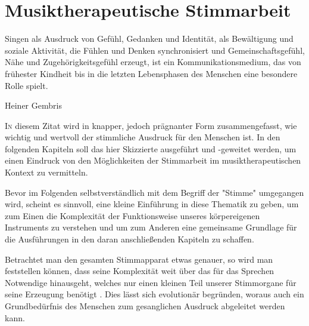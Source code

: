 
\chapter{Musiktherapeutische Stimmarbeit}
\label{chapter:musiktherapeutische_stimmarbeit}

\setlength{\epigraphwidth}{8.0cm}
\epigraph{Singen als Ausdruck von Gefühl, Gedanken und Identität, als Bewältigung und soziale Aktivität, die Fühlen und Denken synchronisiert und Gemeinschaftsgefühl, Nähe und Zugehörigkeitsgefühl erzeugt, ist ein Kommunikationsmedium, das von frühester Kindheit bis in die letzten Lebensphasen des Menschen eine besondere Rolle spielt.}{Heiner Gembris \autocite[12]{gembris2008}}
\ifpdf
    \graphicspath{{3_musiktherapeutische_stimmarbeit/figures/PNG/}{3_musiktherapeutische_stimmarbeit/figures/PDF/}{3_musiktherapeutische_stimmarbeit/figures/}}
\else
    \graphicspath{{3_musiktherapeutische_stimmarbeit/figures/EPS/}{3_musiktherapeutische_stimmarbeit/figures/}}
\fi
\lettrine{I}{n} diesem Zitat wird in knapper, jedoch prägnanter Form zusammengefasst, wie wichtig und wertvoll der stimmliche Ausdruck für den Menschen ist. In den folgenden Kapiteln soll das hier Skizzierte ausgeführt und -geweitet werden, um einen Eindruck von den Möglichkeiten der Stimmarbeit im musiktherapeutischen Kontext zu vermitteln.

Bevor im Folgenden selbstverständlich mit dem Begriff der "Stimme" umgegangen wird, scheint es sinnvoll, eine kleine Einführung in diese Thematik zu geben, um zum Einen die Komplexität der Funktionsweise unseres körpereigenen Instruments zu verstehen und um zum Anderen eine gemeinsame Grundlage für die Ausführungen in den daran anschließenden Kapiteln zu schaffen. 

Betrachtet man den gesamten Stimmapparat etwas genauer, so wird man feststellen können, dass seine Komplexität weit über das für das Sprechen Notwendige hinausgeht, welches nur einen kleinen Teil unserer Stimmorgane für seine Erzeugung benötigt \autocite[vgl.][38]{cramer1998}. Dies lässt sich evolutionär begründen, woraus auch ein Grundbedürfnis des Menschen zum gesanglichen Ausdruck abgeleitet werden kann.

